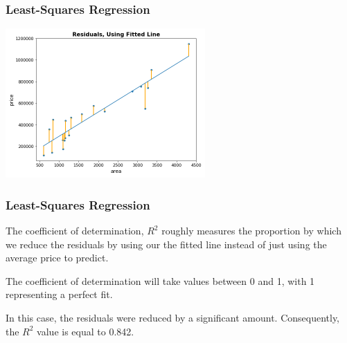 \documentclass[11pt, table]{beamer}
\newcommand{\p}{\pause}
\begin{document}
\begin{frame}
\frametitle{Least-Squares Regression}

\begin{center}
	\includegraphics[width=3in]{images/Appraisal_Values/r2_02.png}
\end{center}

\end{frame}

\begin{frame}
\frametitle{Least-Squares Regression}
The coefficient of determination, $R^2$ roughly measures the proportion by which we reduce the residuals by using our the fitted line instead of just using the average price to predict.\p
\vspace{0.1in}

The coefficient of determination will take values between 0 and 1, with 1 representing a perfect fit.\p
\vspace{0.1in}

In this case, the residuals were reduced by a significant amount. Consequently, the $R^2$ value is equal to 0.842.
\end{frame}
\end{document}
